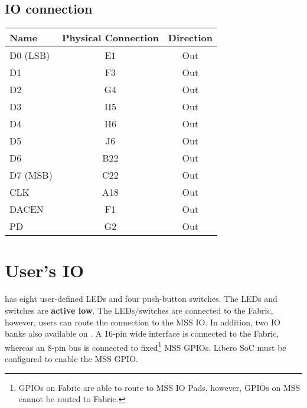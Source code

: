 \subsection{IO connection}
\begin{table}[h]
\centering
\begin{tabular}{|l|c|c|}
	\hline
	{\bf Name} & {\bf Physical Connection} & {\bf Direction}\\ \hline
	D0 (LSB)	& E1  & Out\\ \hline
	D1			& F3  & Out\\ \hline
	D2			& G4  & Out\\ \hline
	D3			& H5  & Out\\ \hline
	D4			& H6  & Out\\ \hline
	D5			& J6  & Out\\ \hline
	D6			& B22 & Out\\ \hline
	D7 (MSB)	& C22 & Out\\ \hline\hline
	CLK			& A18 & Out\\ \hline\hline
	DACEN		& F1  & Out\\ \hline\hline
	PD			& G2  & Out\\ \hline
\end{tabular}
\end{table}

\section{User's IO}
\sdr has eight user-defined LEDs and four push-button switches. The LEDs and switches are {\bf active low}. The LEDs/switches
are connected to the Fabric, however, users can route the connection to the MSS IO. In addition, two IO
banks also available on \sdr. A 16-pin wide interface is connected to the Fabric, whereas an 8-pin
bus is connected to fixed\footnote{GPIOs on Fabric are able to route to MSS IO Pads, however,
GPIOs on MSS cannot be routed to Fabric.}
MSS GPIOs. Libero SoC must be configured to enable the MSS GPIO.

